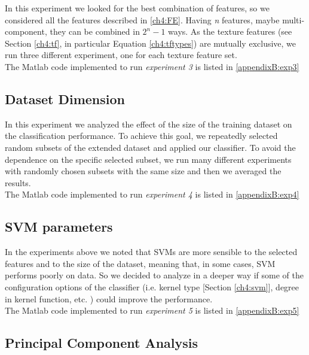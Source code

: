 In this experiment we looked for the best combination of features, so we considered all the features described in \ref{ch4:FE}. Having \textit{n} features, maybe multi-component,
they can be combined in $2^n-1$ ways. As the texture features (see Section \ref{ch4:tf}, in particular Equation \ref{ch4:tftypes}) are mutually exclusive, we run three different
experiment, one for each texture feature set.
\\
The Matlab code implemented to run \textit{experiment 3} is listed in \ref{appendixB:exp3}

\vspace{0.5cm}

\subsection{Dataset Dimension}

In this experiment we analyzed the effect of the size of the training dataset on the classification performance. To achieve this goal, we repeatedly selected random subsets of the
extended dataset and applied our classifier. To avoid the dependence on the specific selected subset, we run many different experiments with randomly chosen subsets with the same 
size and then we averaged the results.
\\
The Matlab code implemented to run \textit{experiment 4} is listed in \ref{appendixB:exp4}

\vspace{0.5cm}

\subsection{SVM parameters}

In the experiments above we noted that \Glspl{SVM} are more sensible to the selected features and to the size of the dataset, meaning that, in some cases, \Gls{SVM} performs poorly on data.
So we decided to analyze in a deeper way if some of the configuration options of the classifier (i.e. kernel type [Section \ref{ch4:svm}], degree in kernel function, etc. ) could improve the performance.
\\
The Matlab code implemented to run \textit{experiment 5} is listed in \ref{appendixB:exp5}

\vspace{0.5cm}


\subsection{Principal Component Analysis}

